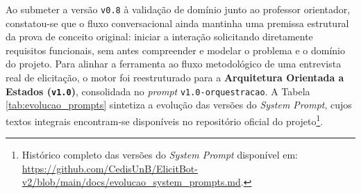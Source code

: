 Ao submeter a versão \texttt{v0.8} à validação de domínio junto ao professor orientador, constatou-se que o fluxo conversacional ainda mantinha uma premissa estrutural da prova de conceito original: iniciar a interação solicitando diretamente requisitos funcionais, sem antes compreender e modelar o problema e o domínio do projeto. Para alinhar a ferramenta ao fluxo metodológico de uma entrevista real de elicitação, o motor foi reestruturado para a \textbf{Arquitetura Orientada a Estados (\texttt{v1.0})}, consolidada no \textit{prompt} \texttt{v1.0-orquestracao}. A Tabela \ref{tab:evolucao_prompts} sintetiza a evolução das versões do \textit{System Prompt}, cujos textos integrais encontram-se disponíveis no repositório oficial do projeto\footnote{Histórico completo das versões do \textit{System Prompt} disponível em: \url{https://github.com/CedisUnB/ElicitBot-v2/blob/main/docs/evolucao_system_prompts.md}.}.

